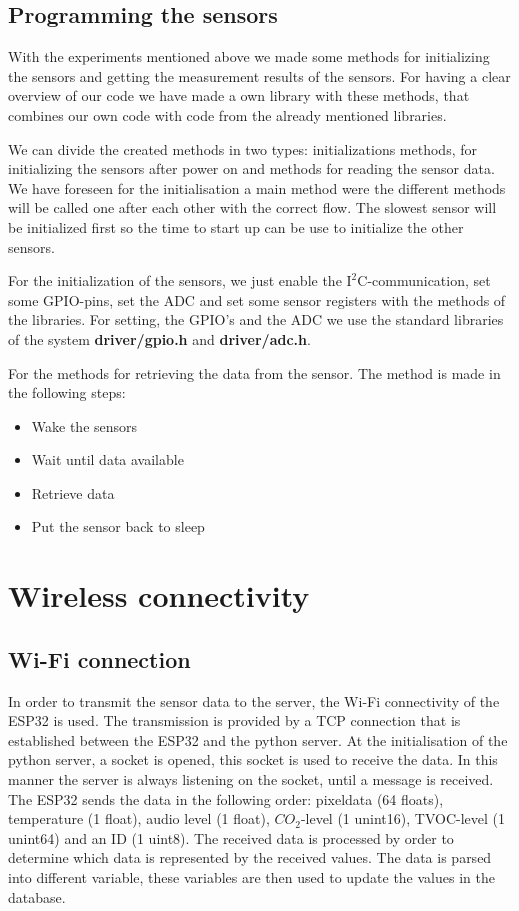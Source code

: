 \documentclass[11pt,a4paper]{article}
\begin{document}
\subsection{Programming the sensors}
With the experiments mentioned above we made some methods for initializing the sensors and getting the measurement results of the sensors. For having a clear overview of our code we have made a own library with these methods, that combines our own code with code from the already mentioned libraries.  

We can divide the created methods in two types: initializations methods, for initializing the sensors after power on and methods for reading the sensor data. We have foreseen for the initialisation a main method were the different methods will be called one after each other with the correct flow. The slowest sensor will be initialized first so the time to start up can be use to initialize the other sensors.

For the initialization of the sensors, we just enable the $\text{I}^2$C-communication, set some GPIO-pins, set the ADC and set some sensor registers with the methods of the libraries. For setting, the GPIO's and the ADC we use the standard libraries of the system \textbf{driver/gpio.h}  and \textbf{driver/adc.h}.

For the methods for retrieving the data from the sensor. The method is made in the following steps:
\begin{itemize}
\item Wake the sensors
\item Wait until data available
\item Retrieve data
\item Put the sensor back to sleep
\end{itemize}


\section{Wireless connectivity}
\subsection{Wi-Fi connection} \label{wifiCon}
In order to transmit the sensor data to the server, the Wi-Fi connectivity of the ESP32 is used. The transmission is provided by a TCP connection that is established between the ESP32 and the python server. At the initialisation of the python server, a socket is opened, this socket is used to receive the data. In this manner the server is always listening on the socket, until a message is received. The ESP32 sends the data in the following order: pixeldata (64 floats), temperature (1 float), audio level (1 float), $CO_2$-level (1 unint16), TVOC-level (1 unint64) and an ID (1 uint8). The received data is processed by order to determine which data is represented by the received values. The data is parsed into different variable, these variables are then used to update the values in the database. 
\end{document}
